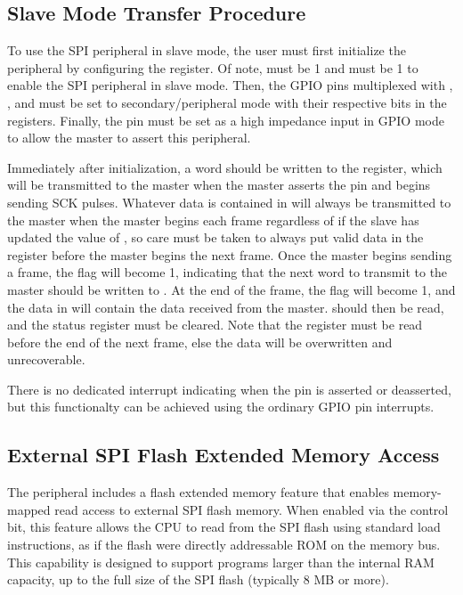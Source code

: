 \subsection{Slave Mode Transfer Procedure}

To use the SPI peripheral in slave mode, the user must first initialize the  peripheral by configuring the  register. Of note,  must be 1 and  must be 1 to enable the SPI peripheral in slave mode. Then, the GPIO pins multiplexed with , , and  must be set to secondary/peripheral mode with their respective bits in the  registers. Finally, the  pin must be set as a high impedance input in GPIO mode to allow the master to assert this  peripheral.

Immediately after initialization, a word should be written to the  register, which will be transmitted to the master when the master asserts the  pin and begins sending SCK pulses. Whatever data is contained in  will always be transmitted to the master when the master begins each frame regardless of if the slave has updated the value of , so care must be taken to always put valid data in the  register before the master begins the next frame. Once the master begins sending a frame, the  flag will become 1, indicating that the next word to transmit to the master should be written to . At the end of the frame, the  flag will become 1, and the data in  will contain the data received from the master.  should then be read, and the status register  must be cleared. Note that the  register must be read before the end of the next frame, else the data will be overwritten and unrecoverable.

There is no dedicated interrupt indicating when the  pin is asserted or deasserted, but this functionalty can be achieved using the ordinary GPIO pin interrupts.



\subsection{External SPI Flash Extended Memory Access}

The  peripheral includes a flash extended memory feature that enables memory-mapped read access to external SPI flash memory. When enabled via the  control bit, this feature allows the CPU to read from the SPI flash using standard load instructions, as if the flash were directly addressable ROM on the memory bus. This capability is designed to support programs larger than the internal RAM capacity, up to the full size of the SPI flash (typically 8 MB or more).

